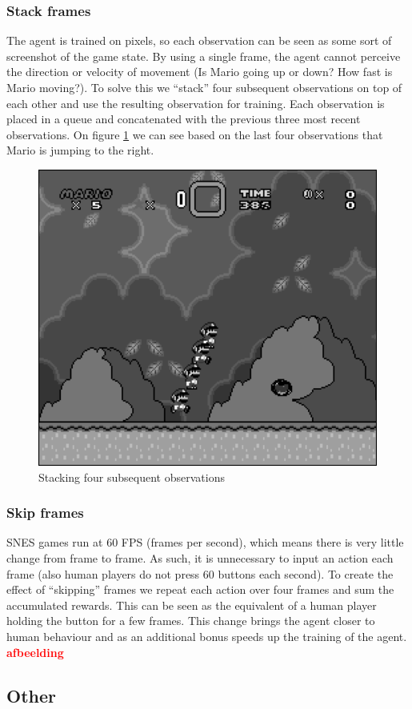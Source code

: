 \documentclass{article}
\begin{document}
\subsubsection{Stack frames}
The agent is trained on pixels, so each observation can be seen as some sort of screenshot of the game state.
By using a single frame, the agent cannot perceive the direction or velocity of movement (Is Mario going up or down? How fast is Mario moving?).
To solve this we ``stack'' four subsequent observations on top of each other and use the resulting observation for training.
Each observation is placed in a queue and concatenated with the previous three most recent observations.
On figure \ref{fig:stack} we can see based on the last four observations that Mario is jumping to the right.
\begin{figure}[ht]
    \centering
    \includegraphics[width=.6\textwidth]{stacked}
    \caption{Stacking four subsequent observations}
    \label{fig:stack}
\end{figure}

\subsubsection{Skip frames}
SNES games run at 60 FPS (frames per second), which means there is very little change from frame to frame.
As such, it is unnecessary to input an action each frame (also human players do not press 60 buttons each second).
To create the effect of ``skipping'' frames we repeat each action over four frames and sum the accumulated rewards.
This can be seen as the equivalent of a human player holding the button for a few frames.
This change brings the agent closer to human behaviour and as an additional bonus speeds up the training of the agent.
\textbf{\textcolor{red}{afbeelding}}

\subsection{Other}
\end{document}

